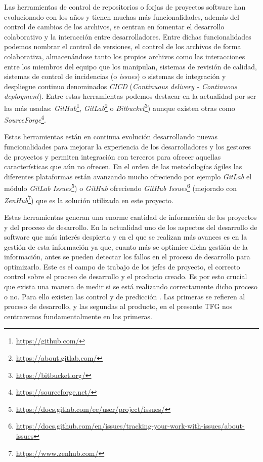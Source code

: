 Las herramientas de control de repositorios o forjas de proyectos software han evolucionado con los años y tienen muchas más funcionalidades, además del control de cambios de los archivos, se centran en fomentar el desarrollo colaborativo y la interacción entre desarrolladores.
Entre dichas funcionalidades podemos nombrar el control de versiones, el control de los archivos de forma colaborativa, almacenándose tanto los propios archivos como las interacciones entre los miembros del equipo que los manipulan, sistemas de revisión de calidad, sistemas de control de incidencias (o \textit{issues}) o sistemas de integración y despliegue continuo denominados \textit{CICD} (\textit{Continuous delivery - Continuous deployment}).
Entre estas herramientas podemos destacar en la actualidad por ser las más usadas:  \textit{GitHub}\footnote{\url{https://github.com/}}, \textit{GitLab}\footnote{\url{https://about.gitlab.com/}} o \textit{Bitbucket}\footnote{\url{https://bitbucket.org/}}) aunque existen otras como \textit{SourceForge}\footnote{\url{https://sourceforge.net/}}.

Estas herramientas están en continua evolución desarrollando nuevas funcionalidades para mejorar la experiencia de los desarrolladores y los gestores de proyectos y permiten integración con terceros para ofrecer aquellas características que aún no ofrecen.
En el orden de las metodologías ágiles las diferentes plataformas están avanzando mucho ofreciendo por ejemplo \textit{GitLab} el módulo \textit{GitLab Issues}\footnote{\url{https://docs.gitlab.com/ee/user/project/issues/}}) o  
\textit{GitHub} ofreciendo \textit{GitHub Issues}\footnote{\url{https://docs.github.com/en/issues/tracking-your-work-with-issues/about-issues}} (mejorado con \textit{ZenHub}\footnote{\url{https://www.zenhub.com/}}) que es la solución utilizada en este proyecto.

Estas herramientas generan una enorme cantidad de información de los proyectos y del proceso de desarrollo. En la actualidad uno de los aspectos del desarrollo de software que más interés despierta y en el que se realizan más avances es en la gestión de esta información ya que, cuanto más se optimice dicha gestión de la información, antes se pueden detectar los fallos en el proceso de desarrollo para optimizarlo.
Este es el campo de trabajo de los jefes de proyecto, el correcto control sobre el proceso de desarrollo y el producto creado. Es por esto crucial que exista una manera de medir si se está realizando correctamente dicho proceso o no.
Para ello existen las control y de predicción \cite{sommerville_ingenierisoftware_2002}. Las primeras se refieren al proceso de desarrollo, y las segundas al producto, en el presente TFG nos centraremos fundamentalmente en las primeras.

